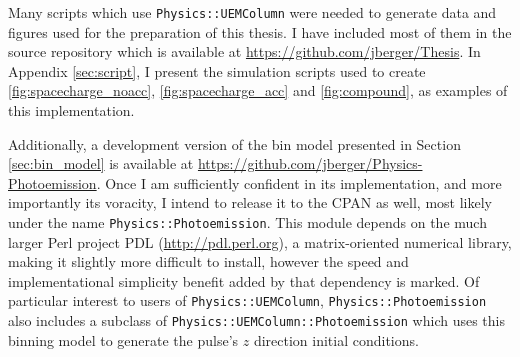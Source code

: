 Many scripts which use \verb!Physics::UEMColumn! were needed to generate data and figures used for the preparation of this thesis.
I have included most of them in the source repository which is available at \url{https://github.com/jberger/Thesis}.
In Appendix \ref{sec:script}, I present the simulation scripts used to create \ref{fig:spacecharge_noacc}, \ref{fig:spacecharge_acc} and \ref{fig:compound}, as examples of this implementation.

Additionally, a development version of the bin model presented in Section \ref{sec:bin_model} is available at \url{https://github.com/jberger/Physics-Photoemission}.
Once I am sufficiently confident in its implementation, and more importantly its voracity, I intend to release it to the CPAN as well, most likely under the name \verb!Physics::Photoemission!.
This module depends on the much larger Perl project PDL (\url{http://pdl.perl.org}), a matrix-oriented numerical library, making it slightly more difficult to install, however the speed and implementational simplicity benefit added by that dependency is marked.
Of particular interest to users of \verb!Physics::UEMColumn!, \verb!Physics::Photoemission! also includes a subclass of \verb!Physics::UEMColumn::Photoemission! which uses this binning model to generate the pulse's $z$ direction initial conditions.


